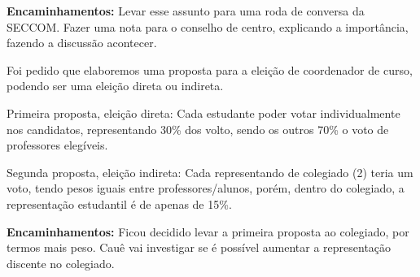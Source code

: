 \documentclass{ata-calico}
\begin{document}
\textbf{Encaminhamentos:} Levar esse assunto para uma roda de conversa da SECCOM. Fazer uma nota para o conselho de centro, explicando a importância, fazendo a discussão acontecer.


Foi pedido que elaboremos uma proposta para a eleição de coordenador de curso, podendo ser uma eleição direta ou indireta.

Primeira proposta, eleição direta: Cada estudante poder votar individualmente nos candidatos, representando 30\% dos volto, sendo os outros 70\% o voto de professores elegíveis.

Segunda proposta, eleição indireta: Cada representando de colegiado (2) teria um voto, tendo pesos iguais entre professores/alunos, porém, dentro do colegiado, a representação estudantil é de apenas de 15\%.\newline

\textbf{Encaminhamentos:} Ficou decidido levar a primeira proposta ao colegiado, por termos mais peso. Cauê vai investigar se é possível aumentar a representação discente no colegiado.


\end{document}
